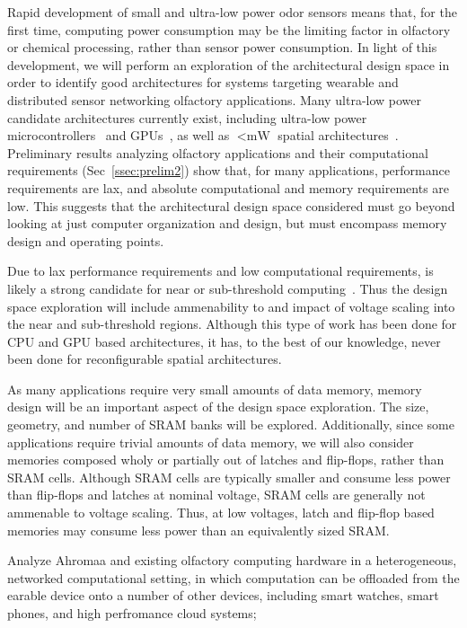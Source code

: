     
\item
    Rapid development of small and ultra-low power odor sensors means that, for
    the first time, computing power consumption may be the limiting factor
    in olfactory or chemical processing, rather than sensor power
    consumption.  In light of this development, we will perform an exploration
    of the architectural design space in order to identify good architectures
    for \olfc{} systems targeting wearable and distributed sensor networking
    olfactory applications.  Many ultra-low power candidate architectures
    currently exist, including ultra-low power microcontrollers~\cite{} and GPUs~\cite{},
    as well as \(<\si{\milli\watt}\) spatial architectures~\cite{}.
    Preliminary results analyzing olfactory applications
    and their computational requirements (Sec~\ref{ssec:prelim2}) show that,
    for many applications, performance requirements are lax, and absolute
    computational and memory requirements are low.  This suggests that the
    architectural design space considered must go beyond looking at just
    computer organization and design, but must encompass memory design and
    operating points.

    Due to lax performance requirements and low computational requirements,
    \olfc{} is likely a strong candidate for near or sub-threshold
    computing~\cite{}.  Thus the design space exploration will include
    ammenability to and impact of voltage scaling into the near and sub-threshold
    regions.  Although this type of work has been done for CPU and GPU based
    architectures, it has, to the best of our knowledge, never been done for
    reconfigurable spatial architectures.
    
    As many \olfc{} applications require very small amounts of data memory,
        memory design will be an important aspect of the design space
        exploration.  The size, geometry, and number of SRAM banks will be
        explored.  Additionally, since some applications require trivial
        amounts of data memory, we will also consider memories composed wholy
        or partially out of latches and flip-flops, rather than SRAM cells.
        Although SRAM cells are typically smaller and consume less power than
        flip-flops and latches at nominal voltage, SRAM cells are generally not
        ammenable to voltage scaling.  Thus, at low voltages, latch and
        flip-flop based memories may consume less power than an equivalently
        sized SRAM.

\item Analyze Ahromaa and existing olfactory computing hardware in a heterogeneous, networked
     computational setting, in which computation can be offloaded from the earable
     device onto a number of other devices, including smart watches, smart phones,
     and high perfromance cloud systems;


